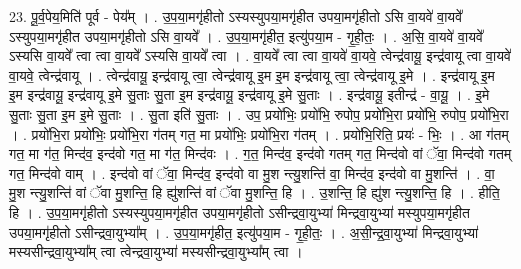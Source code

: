 \documentclass[17pt]{extarticle}
\begin{document}
23. पू॒र्व॒पेय॒मिति॑ पूर्व - पेय᳚म् । . उ॒प॒या॒मगृ॑हीतो ऽस्यस्युपया॒मगृ॑हीत उपया॒मगृ॑हीतो ऽसि वा॒यवे॑ वा॒यवे᳚ ऽस्युपया॒मगृ॑हीत उपया॒मगृ॑हीतो ऽसि वा॒यवे᳚ । . उ॒प॒या॒मगृ॑हीत॒ इत्यु॑पया॒म - गृ॒ही॒तः॒ । . अ॒सि॒ वा॒यवे॑ वा॒यवे᳚ ऽस्यसि वा॒यवे᳚ त्वा त्वा वा॒यवे᳚ ऽस्यसि वा॒यवे᳚ त्वा । . वा॒यवे᳚ त्वा त्वा वा॒यवे॑ वा॒यवे॒ त्वेन्द्र॑वायू॒ इन्द्र॑वायू त्वा वा॒यवे॑ वा॒यवे॒ त्वेन्द्र॑वायू । . त्वेन्द्र॑वायू॒ इन्द्र॑वायू त्वा॒ त्वेन्द्र॑वायू इ॒म इ॒म इन्द्र॑वायू त्वा॒ त्वेन्द्र॑वायू इ॒मे । . इन्द्र॑वायू इ॒म इ॒म इन्द्र॑वायू॒ इन्द्र॑वायू इ॒मे सु॒ताः सु॒ता इ॒म इन्द्र॑वायू॒ इन्द्र॑वायू इ॒मे सु॒ताः । . इन्द्र॑वायू॒ इतीन्द्र॑ - वा॒यू॒ । . इ॒मे सु॒ताः सु॒ता इ॒म इ॒मे सु॒ताः । . सु॒ता इति॑ सु॒ताः । . उप॒ प्रयो॑भिः॒ प्रयो॑भि॒ रुपोप॒ प्रयो॑भि॒रा प्रयो॑भि॒ रुपोप॒ प्रयो॑भि॒रा । . प्रयो॑भि॒रा प्रयो॑भिः॒ प्रयो॑भि॒रा ग॑तम् गत॒ मा प्रयो॑भिः॒ प्रयो॑भि॒रा ग॑तम् । . प्रयो॑भि॒रिति॒ प्रयः॑ - भिः॒ । . आ ग॑तम् गत॒ मा ग॑त॒ मिन्द॑व॒ इन्द॑वो गत॒ मा ग॑त॒ मिन्द॑वः । . ग॒त॒ मिन्द॑व॒ इन्द॑वो गतम् गत॒ मिन्द॑वो वां ॅवा॒ मिन्द॑वो गतम् गत॒ मिन्द॑वो वाम् । . इन्द॑वो वां ॅवा॒ मिन्द॑व॒ इन्द॑वो वा मु॒श न्त्यु॒शन्ति॑ वा॒ मिन्द॑व॒ इन्द॑वो वा मु॒शन्ति॑ । . वा॒ मु॒श न्त्यु॒शन्ति॑ वां ॅवा मु॒शन्ति॒ हि ह्यु॑शन्ति॑ वां ॅवा मु॒शन्ति॒ हि । . उ॒शन्ति॒ हि ह्यु॑श न्त्यु॒शन्ति॒ हि । . हीति॒ हि । . उ॒प॒या॒मगृ॑हीतो ऽस्यस्युपया॒मगृ॑हीत उपया॒मगृ॑हीतो ऽसीन्द्रवा॒युभ्या॑ मिन्द्रवा॒युभ्या॑ मस्युपया॒मगृ॑हीत उपया॒मगृ॑हीतो ऽसीन्द्रवा॒युभ्या᳚म् । . उ॒प॒या॒मगृ॑हीत॒ इत्यु॑पया॒म - गृ॒ही॒तः॒ । . अ॒सी॒न्द्र॒वा॒युभ्या॑ मिन्द्रवा॒युभ्या॑ मस्यसीन्द्रवा॒युभ्या᳚म् त्वा त्वेन्द्रवा॒युभ्या॑ मस्यसीन्द्रवा॒युभ्या᳚म् त्वा । \newline
\end{document}
